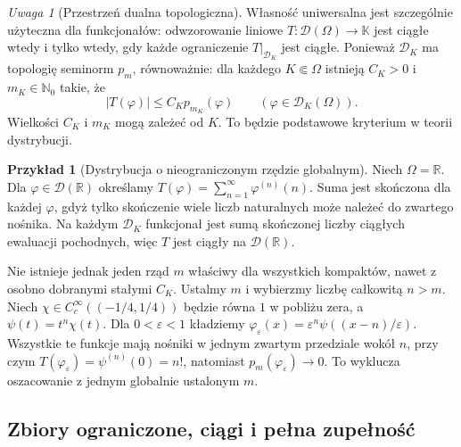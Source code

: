 \documentclass[11pt,a4paper]{article}
\numberwithin{equation}{section}
\theoremstyle{plain}
\theoremstyle{definition}
\newtheorem{przyklad}[twierdzenie]{Przykład}
\theoremstyle{remark}
\newtheorem{uwaga}[twierdzenie]{Uwaga}
\newcommand{\R}{\mathbb R}
\newcommand{\N}{\mathbb N}
\newcommand{\K}{\mathbb K}
\begin{document}
\begin{uwaga}[Przestrzeń dualna topologiczna]
\label{rem:D-dual18}
Własność uniwersalna jest szczególnie użyteczna dla
funkcjonałów: odwzorowanie liniowe $T:\mathcal D(\Omega)\to\K$
jest ciągłe wtedy i tylko wtedy, gdy każde ograniczenie
$T|_{\mathcal D_K}$ jest ciągłe. Ponieważ $\mathcal D_K$
ma topologię seminorm $p_m$, równoważnie: dla każdego
$K\Subset\Omega$ istnieją $C_K>0$ i $m_K\in\N_0$ takie, że
\[
 |T(\varphi)|\le C_K p_{m_K}(\varphi)
 \qquad(\varphi\in\mathcal D_K(\Omega)).
\]
Wielkości $C_K$ i $m_K$ mogą zależeć od $K$.
To będzie podstawowe kryterium w teorii dystrybucji.
\end{uwaga}


\begin{przyklad}[Dystrybucja o nieograniczonym rzędzie globalnym]
\label{ex:variable-order18}
Niech $\Omega=\R$. Dla $\varphi\in\mathcal D(\R)$ określamy
$T(\varphi)=\sum_{n=1}^\infty \varphi^{(n)}(n)$.
Suma jest skończona dla każdej $\varphi$, gdyż tylko skończenie
wiele liczb naturalnych może należeć do zwartego nośnika.
Na każdym $\mathcal D_K$ funkcjonał jest sumą skończonej
liczby ciągłych ewaluacji pochodnych, więc $T$ jest ciągły
na $\mathcal D(\R)$.

Nie istnieje jednak jeden rząd $m$ właściwy dla wszystkich
kompaktów, nawet z osobno dobranymi stałymi $C_K$.
Ustalmy $m$ i wybierzmy liczbę całkowitą $n>m$.
Niech $\chi\in C_c^\infty((-1/4,1/4))$ będzie równa $1$
w pobliżu zera, a $\psi(t)=t^n\chi(t)$. Dla $0<\varepsilon<1$
kładziemy $\varphi_\varepsilon(x)=\varepsilon^n
\psi((x-n)/\varepsilon)$. Wszystkie te funkcje mają
nośniki w jednym zwartym przedziale wokół $n$, przy czym
$T(\varphi_\varepsilon)=\psi^{(n)}(0)=n!$,
natomiast $p_m(\varphi_\varepsilon)\to0$.
To wyklucza oszacowanie z jednym globalnie ustalonym $m$.
\end{przyklad}

\subsection{Zbiory ograniczone, ciągi i pełna zupełność}
\end{document}

